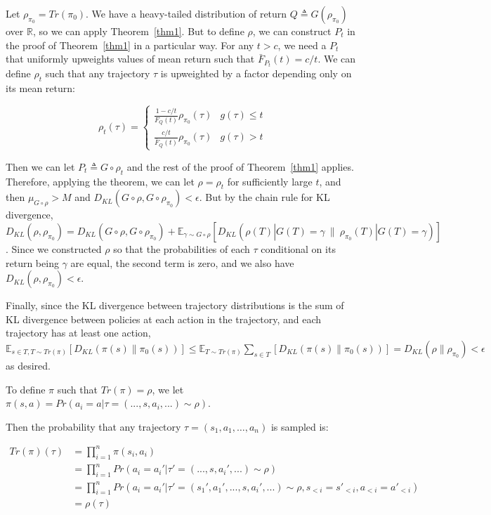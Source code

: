 \documentclass{article}
\begin{document}
Let \(\rho_{\pi_0} = Tr(\pi_0)\). We have a heavy-tailed distribution of
return \(Q \triangleq G(\rho_{\pi_0})\) over \(\mathbb R\), so we can
apply Theorem~\ref{thm1}. But to define \(\rho\), we can construct \(P_t\) in the
proof of Theorem~\ref{thm1} in a particular way. For any \(t>c\), we need a
\(P_t\) that uniformly upweights values of mean return such that
\(\bar F_{P_t}(t) = c/t\). We can define \(\rho_t\) such that any
trajectory \(\tau\) is upweighted by a factor depending only on its mean
return:

\[
\rho_t(\tau) = \begin{cases} \frac{1 - c/t}{F_Q(t)} \rho_{\pi_0}(\tau) & g(\tau) \le t
\\ \frac{c/t}{\bar F_Q(t)}\rho_{\pi_0}(\tau) & g(\tau) > t
\end{cases}
\]

Then we can let \(P_t \triangleq G \circ \rho_t\) and the rest of the
proof of Theorem~\ref{thm1} applies. Therefore, applying the theorem, we can let
\(\rho = \rho_t\) for sufficiently large \(t\), and then
\(\mu_{G \circ \rho} > M\) and
\(D_{KL}(G \circ \rho, G \circ \rho_{\pi_0}) < \epsilon\). But by the
chain rule for KL divergence,
\(D_{KL}(\rho, \rho_{\pi_0}) = D_{KL}(G\circ \rho, G \circ \rho_{\pi_0}) + \mathbb E_{\gamma \sim G\circ\rho}[D_{KL}(\rho(T) | G(T)=\gamma \ \|\ \rho_{\pi_0}(T) | G(T)=\gamma)]\).
Since we constructed \(\rho\) so that the probabilities of each \(\tau\)
conditional on its return being \(\gamma\) are equal, the second term is
zero, and we also have \(D_{KL}(\rho, \rho_{\pi_0}) < \epsilon\).

Finally, since the KL divergence between trajectory distributions is the
sum of KL divergence between policies at each action in the trajectory,
and each trajectory has at least one action,
\(\mathbb E_{s \in T, T\sim Tr(\pi)}[D_{KL}(\pi(s) \| \pi_0(s))] \le \mathbb E_{T\sim Tr(\pi)} \sum_{s \in T}[D_{KL}(\pi(s) \| \pi_0(s))] = D_{KL}(\rho \| \rho_{\pi_0}) < \epsilon\)
as desired.

To define \(\pi\) such that \(Tr(\pi) = \rho\), we let
\(\pi(s, a) = Pr(a_i = a | \tau = (..., s, a_i, ...) \sim \rho)\).

Then the probability that any trajectory
\(\tau = (s_1, a_1, \dots, a_n)\) is sampled is:

\begin{align}
Tr(\pi)(\tau) &= \prod_{i=1}^n \pi(s_i, a_i) 
\\&= \prod_{i=1}^n Pr(a_i=a_i' | \tau' = (..., s, a_i', ...) \sim \rho)
\\&= \prod_{i=1}^n Pr(a_i = a_i' | \tau' = (s_1', a_1', ..., s, a_i', ...) \sim \rho, s_{<i} = s'_{<i}, a_{<i} = a'_{<i})
\\&= \rho(\tau)
\end{align}
\end{document}
